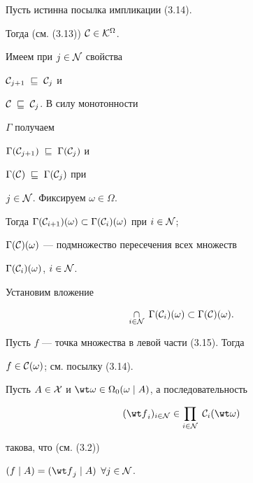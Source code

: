 \begin{pf}


Пусть истинна посылка импликации (3.14).


Тогда (см. (3.13)) ${\cal C} \in {{\cal K}^{\Omega}}$.


Имеем при $j \in {\cal N}$ свойства


${{\cal C}_{j+1}}\;\sqsubseteq\;{{\cal C}_j}$ и


${\cal C}\;\sqsubseteq\;{{\cal C}_j}$. В силу монотонности


$\Gamma$ получаем


${{\Gamma}({\cal C}_{j+1})}\;\sqsubseteq\;{{\Gamma}({\cal C}_j)}$ и


${{\Gamma}({\cal C})}\;\sqsubseteq\;{{\Gamma}({\cal C}_j)}$ при


$j \in {\cal N}$. Фиксируем $\omega \in \Omega$.


Тогда ${{\Gamma}({\cal C}_{i+1})(\omega)} \subset


{{\Gamma}({\cal C}_i)(\omega)}$ при $i \in {\cal N}$;


${\Gamma}({\cal C})(\omega)$ --- подмножество пересечения всех множеств


${{\Gamma}({\cal C}_i)(\omega)}$, $i \in {\cal N}$.


Установим вложение


\begin{equation}


\mathop{\cap}\limits_{i \in {\cal N}}\; {{\Gamma}({\cal C}_i)(\omega)}


\subset {{\Gamma}({\cal C})(\omega)}.


\end{equation}


Пусть $f$ --- точка множества в левой части (3.15). Тогда


$f \in {{\cal C}(\omega)}$; см. посылку (3.14).


Пусть $A \in {\cal X}$ и ${\wt \omega} \in {{{\Omega}_0}(\omega \mid


A)}$, а последовательность


\begin{equation}


({\wt f}_i)_{i \in {\cal N}} \in


\prod_{i \in {\cal N}}\;{{\cal C}_i}(\wt \omega)


\end{equation}


такова, что (см. (3.2))


$(f \mid A) = ({\wt f}_j \mid A)$ $\forall{j} \in {\cal N}$.



\end{pf}
